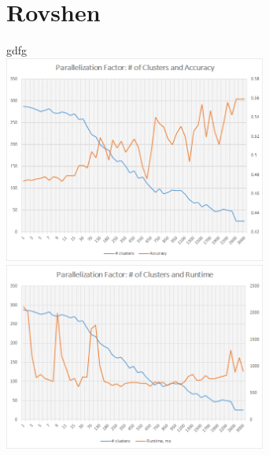 \documentclass[journal]{IEEEtran}
\begin{document}
\section{Rovshen}
gdfg\\
\includegraphics[width=3.4in,clip,keepaspectratio]{clusters-accuracy-parallel}
\includegraphics[width=3.4in,clip,keepaspectratio]{clusters-runtime-parallel}

%
%
\end{document}
